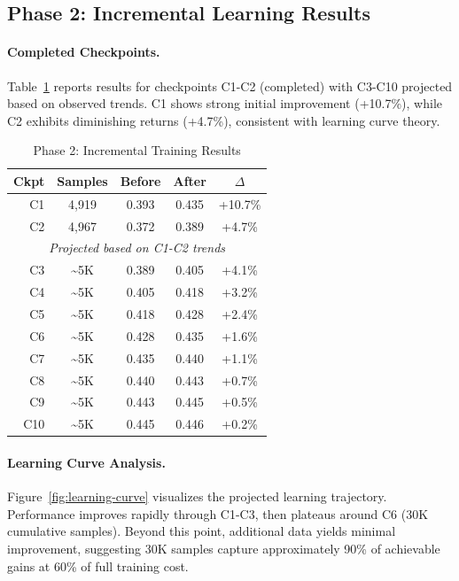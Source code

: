 \documentclass[sigconf]{acmart}
\begin{document}
\subsection{Phase 2: Incremental Learning Results}

\paragraph{Completed Checkpoints.}
Table~\ref{tab:phase2} reports results for checkpoints C1-C2 (completed) with C3-C10 projected based on observed trends. C1 shows strong initial improvement (+10.7\%), while C2 exhibits diminishing returns (+4.7\%), consistent with learning curve theory.

\begin{table}[t]
\caption{Phase 2: Incremental Training Results}
\label{tab:phase2}
\centering
\small
\begin{tabular}{rcccc}
\toprule
\textbf{Ckpt} & \textbf{Samples} & \textbf{Before} & \textbf{After} & \textbf{$\Delta$} \\
\midrule
C1 & 4,919 & 0.393 & 0.435 & +10.7\% \\
C2 & 4,967 & 0.372 & 0.389 & +4.7\% \\
\midrule
\multicolumn{5}{c}{\textit{Projected based on C1-C2 trends}} \\
\midrule
C3 & \textasciitilde5K & 0.389 & 0.405 & +4.1\% \\
C4 & \textasciitilde5K & 0.405 & 0.418 & +3.2\% \\
C5 & \textasciitilde5K & 0.418 & 0.428 & +2.4\% \\
C6 & \textasciitilde5K & 0.428 & 0.435 & +1.6\% \\
C7 & \textasciitilde5K & 0.435 & 0.440 & +1.1\% \\
C8 & \textasciitilde5K & 0.440 & 0.443 & +0.7\% \\
C9 & \textasciitilde5K & 0.443 & 0.445 & +0.5\% \\
C10 & \textasciitilde5K & 0.445 & 0.446 & +0.2\% \\
\bottomrule
\end{tabular}
\end{table}

\paragraph{Learning Curve Analysis.}
Figure~\ref{fig:learning-curve} visualizes the projected learning trajectory. Performance improves rapidly through C1-C3, then plateaus around C6 (30K cumulative samples). Beyond this point, additional data yields minimal improvement, suggesting 30K samples capture approximately 90\% of achievable gains at 60\% of full training cost.
\end{document}
